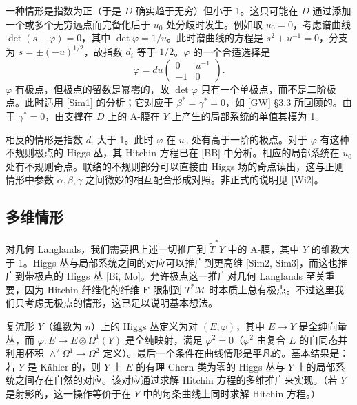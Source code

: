 一种情形是指数为正（于是 $D$ 确实趋于无穷）但小于 1。这只可能在 $D$ 通过添加一个或多个无穷远点而完备化后于 $u_0$ 处分歧时发生。例如取 $u_0=0$，考虑谱曲线 $\det(s-\varphi)=0$，其中 $\det\varphi=1/u$。此时谱曲线的方程是 $s^2+u^{-1}=0$，分支为 $s=\pm(-u)^{1/2}$，故指数 $d_i$ 等于 $1/2$。$\varphi$ 的一个合适选择是
\begin{equation}\tag{4.26}
\varphi=du\begin{pmatrix}0&u^{-1}\\-1&0\end{pmatrix}.
\end{equation}
$\varphi$ 有极点，但极点的留数是幂零的，故 $\det\varphi$ 只有一个单极点，而不是二阶极点。此时适用 [Sim1] 的分析；它对应于 $\beta^*=\gamma^*=0$，如 [GW] §3.3 所回顾的。由于 $\gamma^*=0$，由支撑在 $D$ 上的 A-膜在 $Y$ 上产生的局部系统的单值其模为 1。

相反的情形是指数 $d_i$ 大于 1。此时 $\varphi$ 在 $u_0$ 处有高于一阶的极点。对于 $\varphi$ 有这种不规则极点的 Higgs 丛，其 Hitchin 方程已在 [BB] 中分析。相应的局部系统在 $u_0$ 处有不规则奇点。联络的不规则部分可以直接由 Higgs 场的奇点读出，这与正则情形中参数 $\alpha,\beta,\gamma$ 之间微妙的相互配合形成对照。非正式的说明见 [Wi2]。


\subsection{多维情形}

对几何 Langlands，我们需要把上述一切推广到 $\widetilde{T}^*Y$ 中的 A-膜，其中 $Y$ 的维数大于 1。Higgs 丛与局部系统之间的对应可以推广到更高维 [Sim2, Sim3]，而这也推广到带极点的 Higgs 丛 [Bi, Mo]。允许极点这一推广对几何 Langlands 至关重要，因为 Hitchin 纤维化的纤维 $\boldsymbol{F}$ 限制到 $T^*\mathcal{M}$ 时本质上总有极点。不过这里我们只考虑无极点的情形，这已足以说明基本想法。

复流形 $Y$（维数为 $n$）上的 Higgs 丛定义为对 $(E,\varphi)$，其中 $E\to Y$ 是全纯向量丛，而 $\varphi:E\to E\otimes\Omega^1(Y)$ 是全纯映射，满足 $\varphi^2=0$（$\varphi^2$ 由复合 $E$ 的自同态并利用杯积 $\wedge^2\Omega^1\to\Omega^2$ 定义）。最后一个条件在曲线情形是平凡的。基本结果是：若 $Y$ 是 Kähler 的，则 $Y$ 上 $E$ 的有理 Chern 类为零的 Higgs 丛与 $Y$ 上的局部系统之间存在自然的对应。该对应通过求解 Hitchin 方程的多维推广来实现。（若 $Y$ 是射影的，这一操作等价于在 $Y$ 中的每条曲线上同时求解 Hitchin 方程。）

